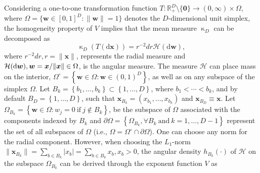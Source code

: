 \documentclass[lineno]{biometrika}
\begin{document}
Considering a one-to-one transformation function $T:\mathbb R^D_+ \setminus \{\bm 0\}\to (0,\infty)\times \Omega$, where $\Omega = \{\bm w\in[0,1]^D: \|\bm w\| = 1\}$ denotes the $D$-dimensional unit simplex, the homogeneity property of $V$ implies that the mean measure $\upkappa_D$ can be decomposed as
\begin{equation}\label{eq:decomposition}
\upkappa_D(T(\text{d}\bm x)) = r^{-2}dr\mathcal H(\text{d}\bm w),
\end{equation}
where $r^{-2}dr, r=\|\bm x\|$, represents the radial measure and $\mathcal H(\text d\bm w), \bm w = \bm x / \|\bm x\| \in \Omega$, is the angular measure. 
The measure $\mathcal H$ can place mass on the interior, $\Omega^\circ = \left\{ \bm w \in \Omega: \bm w \in (0,1)^D \right\}$, as well as on any subspace of the simplex $\Omega$. Let $B_k = \left\{ b_1, \ldots, b_k\right\} \subset \left\{ 1, \ldots, D\right\}$, where $b_1 < \cdots < b_k$, and by default $B_D = \left\{ 1, \ldots, D \right\}$, such that $\bm x_{B_k} = \left( x_{b_1}, \ldots, x_{b_k}\right)$ and $\bm x_{B_D} \equiv \bm x$. Let $\Omega_{B_k} = \left\{ \bm w \in \Omega: w_j=0\ \text{if}\  j \notin B_k \right\}$, be the subspace of $\Omega$ associated with the components indexed by $B_k$ and $\partial\Omega = \left\{ \Omega_{B_k}, \forall B_k \ \text{and}\ k=1, \ldots, D-1 \right\}$ represent the set of all subspaces of $\Omega$ (i.e., $\Omega = \Omega^\circ \cap \partial\Omega$).
One can choose any norm for the radial component. However, when choosing the $L_1$-norm $\|\bm x_{B_k}\|=\sum_{b \in B_k} |x_b|=\sum_{b \in B_k} x_b, x_b>0$, the angular density $h_{B_k}(\cdot)$ of $\mathcal H$ on the subspace $\Omega_{B_k}$ can be derived through the exponent function $V$ as
\end{document}
